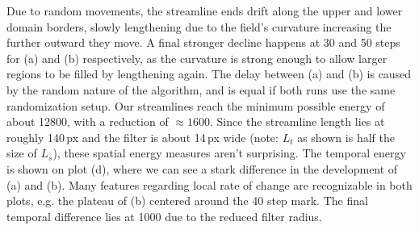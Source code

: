 Due to random movements, the streamline ends drift along the upper and lower domain borders,
slowly lengthening due to the field's curvature increasing the further outward they move.
A final stronger decline happens at 30 and 50 steps for (a) and (b) respectively, as the curvature is strong enough to allow larger regions to be filled by lengthening again.
The delay between (a) and (b) is caused by the random nature of the algorithm, and is equal if both runs use the same randomization setup.
Our streamlines reach the minimum possible energy of about 12800, with a reduction of $\approx 1600$.
Since the streamline length lies at roughly 140\,px and the filter is about 14\,px wide (note: $L_t$ as shown is half the size of $L_s$),
these spatial energy measures aren't surprising. The temporal energy is shown on plot (d), where we can see a stark difference in the development of (a) and (b).
Many features regarding local rate of change are recognizable in both plots,
e.g. the plateau of (b) centered around the 40 step mark.
The final temporal difference lies at 1000 due to the reduced filter radius.
\newpage

